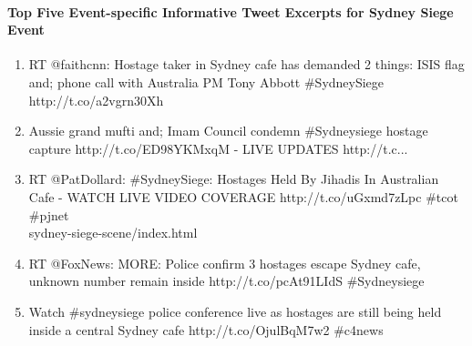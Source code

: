 \paragraph{Top Five Event-specific Informative Tweet Excerpts for Sydney Siege Event}
\begin{enumerate}
\item RT @faithcnn: Hostage taker in Sydney cafe has demanded 2 things: ISIS flag and; phone call with Australia PM Tony Abbott \#SydneySiege http://t.co/a2vgrn30Xh
\item Aussie grand mufti and; Imam Council condemn \#Sydneysiege hostage capture http://t.co/ED98YKMxqM - LIVE UPDATES http://t.c...
\item RT @PatDollard: \#SydneySiege: Hostages Held By Jihadis In Australian Cafe - WATCH LIVE VIDEO COVERAGE http://t.co/uGxmd7zLpc \#tcot \#pjnet \\ sydney-siege-scene/index.html
\item RT @FoxNews: MORE: Police confirm 3 hostages escape Sydney cafe, unknown number remain inside http://t.co/pcAt91LIdS \#Sydneysiege
\item Watch \#sydneysiege police conference live as hostages are still being held inside a central Sydney cafe http://t.co/OjulBqM7w2 \#c4news
\end{enumerate}









